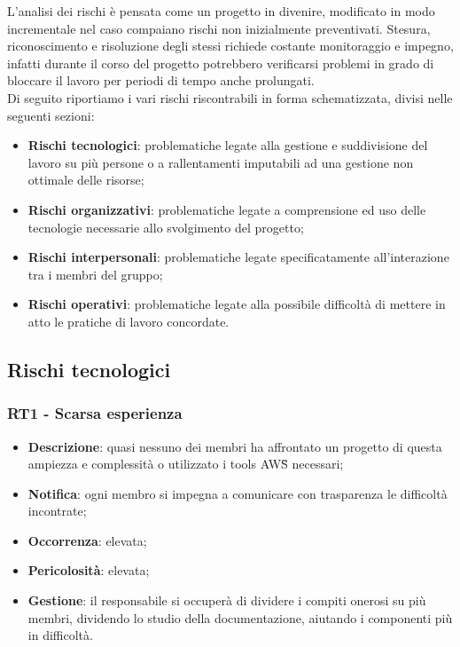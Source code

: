 L'analisi dei rischi è pensata come un progetto in divenire, modificato in modo incrementale nel caso compaiano rischi non inizialmente preventivati. Stesura, riconoscimento e risoluzione degli stessi richiede costante monitoraggio e impegno, infatti durante il corso del progetto potrebbero verificarsi problemi in grado di bloccare il lavoro per periodi di tempo anche prolungati. \\
 Di seguito riportiamo i vari rischi riscontrabili in forma schematizzata, divisi nelle seguenti sezioni:
\begin{itemize}
   \item \textbf{Rischi tecnologici}: problematiche legate alla gestione e suddivisione del lavoro su più persone o a rallentamenti imputabili ad una gestione non ottimale delle risorse;
   \item \textbf{Rischi organizzativi}: problematiche legate a comprensione ed uso delle tecnologie necessarie allo svolgimento del progetto;
   \item \textbf{Rischi interpersonali}: problematiche legate specificatamente all'interazione tra i membri del gruppo;
   \item \textbf{Rischi operativi}: problematiche legate alla possibile difficoltà di mettere in atto le pratiche di lavoro concordate.
\end{itemize}

   \subsection{Rischi tecnologici}
   
   \subsubsection*{RT1 - Scarsa esperienza}
   \begin{itemize}
   	\item \textbf{Descrizione}: quasi nessuno dei membri ha affrontato un progetto di questa ampiezza e complessità o utilizzato i tools AWS\G{} necessari;
   	\item \textbf{Notifica}: ogni membro si impegna a comunicare con trasparenza le difficoltà incontrate;
   	\item \textbf{Occorrenza}: elevata;
   	\item \textbf{Pericolosità}: elevata;
   	\item \textbf{Gestione}: il responsabile si occuperà di dividere i compiti onerosi su più membri, dividendo lo studio della documentazione, aiutando i componenti più in difficoltà.
   \end{itemize}

